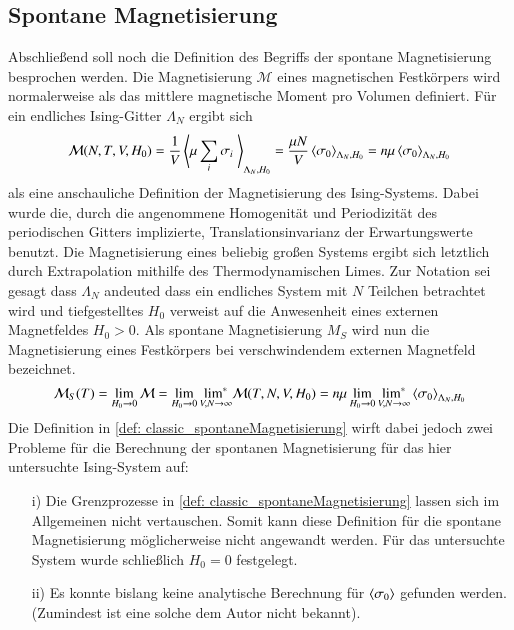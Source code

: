 \subsection{Spontane Magnetisierung}

Abschließend soll noch die Definition des Begriffs der spontane Magnetisierung besprochen werden. Die Magnetisierung $\mathcal{M}$ eines magnetischen Festkörpers wird normalerweise als das mittlere magnetische Moment pro Volumen definiert. Für ein endliches Ising-Gitter $\Lambda_N$ ergibt sich 
\begin{equation} \label{Classic_Magnatization}
\mathcal{M}(N,T,V,H_0)  = \frac{1}{V}\left\langle  \mu \sum_i \sigma_i\; \right\rangle_{\Lambda_N, H_0} = \frac{\mu N}{V}\left\langle \sigma_0 \right\rangle_{\Lambda_N, H_0} = n \mu \left\langle \sigma_0 \right\rangle_{\Lambda_N, H_0} 
\end{equation}
als eine anschauliche Definition der Magnetisierung des Ising-Systems. Dabei wurde die, durch die angenommene Homogenität und Periodizität des periodischen Gitters implizierte, Translationsinvarianz der Erwartungswerte benutzt. Die Magnetisierung eines beliebig großen Systems ergibt sich letztlich durch Extrapolation mithilfe des Thermodynamischen Limes. Zur Notation sei gesagt dass $\Lambda_N$ andeuted dass ein endliches System mit $N$ Teilchen betrachtet wird und tiefgestelltes $H_0$ verweist auf die Anwesenheit eines externen Magnetfeldes $H_0 > 0$. Als spontane Magnetisierung $M_S$ wird nun die Magnetisierung eines Festkörpers bei verschwindendem externen Magnetfeld bezeichnet. 
\begin{equation} \label{def: classic_spontaneMagnetisierung}
\mathcal{M}_S(T) = \lim_{H_0 \rightarrow 0} \mathcal{M} = \lim_{H_0 \rightarrow 0} \underset{V,N \to \infty}{\text{lim}^{*}} \mathcal{M}(T,N,V,H_0) =  n \mu \lim_{H_0 \rightarrow 0} \underset{V,N \to \infty}{\text{lim}^{*}} \left\langle \sigma_0 \right\rangle_{\Lambda_N, H_0} 
\end{equation}
\noindent Die Definition in \eqref{def: classic_spontaneMagnetisierung} wirft dabei jedoch zwei Probleme für die Berechnung der spontanen  Magnetisierung für das hier untersuchte Ising-System auf:
\begin{itemize}
\item [i)] Die Grenzprozesse in \eqref{def: classic_spontaneMagnetisierung} lassen sich im Allgemeinen nicht vertauschen. Somit kann diese Definition für die spontane Magnetisierung möglicherweise nicht angewandt werden. Für das untersuchte System wurde schließlich $H_0 = 0$ festgelegt. 
\item [ii)] Es konnte bislang keine analytische Berechnung für $\left\langle \sigma_0 \right\rangle$ gefunden werden.  (Zumindest ist eine solche dem Autor nicht bekannt). 
\end{itemize}

